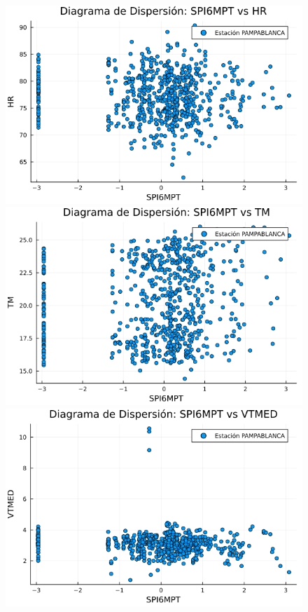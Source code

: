 \begin{figure}[htbp]
\begin{minipage}{0.32\textwidth}
    \centering
    \includegraphics[width=\linewidth]{Capitulos/Scaterplot/PAMPABLANCA_SPI6MPT_vs_HR.png}
\end{minipage}\hfill
\begin{minipage}{0.32\textwidth}
    \centering
    \includegraphics[width=\linewidth]{Capitulos/Scaterplot/PAMPABLANCA_SPI6MPT_vs_TM.png}
\end{minipage}\hfill
\begin{minipage}{0.32\textwidth}
    \centering
    \includegraphics[width=\linewidth]{Capitulos/Scaterplot/PAMPABLANCA_SPI6MPT_vs_VTMED.png}

\end{minipage}
\end{figure}
